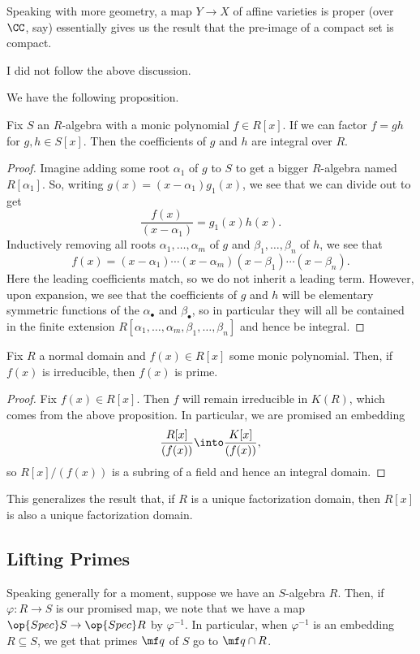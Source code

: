 Speaking with more geometry, a map $Y\to X$ of affine varieties is proper (over $\CC$, say) essentially gives us the result that the pre-image of a compact set is compact.
\begin{remark}
	I did not follow the above discussion.
\end{remark}
We have the following proposition.
\begin{proposition}
	Fix $S$ an $R$-algebra with a monic polynomial $f\in R[x]$. If we can factor $f=gh$ for $g,h\in S[x]$. Then the coefficients of $g$ and $h$ are integral over $R$.
\end{proposition}
\begin{proof}
	Imagine adding some root $\alpha_1$ of $g$ to $S$ to get a bigger $R$-algebra named $R[\alpha_1]$. So, writing $g(x)=(x-\alpha_1)g_1(x)$, we see that we can divide out to get
	\[\frac{f(x)}{(x-\alpha_1)}=g_1(x)h(x).\]
	Inductively removing all roots $\alpha_1,\ldots,\alpha_m$ of $g$ and $\beta_1,\ldots,\beta_n$ of $h$, we see that
	\[f(x)=(x-\alpha_1)\cdots(x-\alpha_m)(x-\beta_1)\cdots(x-\beta_n).\]
	Here the leading coefficients match, so we do not inherit a leading term. However, upon expansion, we see that the coefficients of $g$ and $h$ will be elementary symmetric functions of the $\alpha_\bullet$ and $\beta_\bullet$, so in particular they will all be contained in the finite extension $R[\alpha_1,\ldots,\alpha_m,\beta_1,\ldots,\beta_n]$ and hence be integral.
\end{proof}
\begin{corollary}
	Fix $R$ a normal domain and $f(x)\in R[x]$ some monic polynomial. Then, if $f(x)$ is irreducible, then $f(x)$ is prime.
\end{corollary}
\begin{proof}
	Fix $f(x)\in R[x]$. Then $f$ will remain irreducible in $K(R)$, which comes from the above proposition. In particular, we are promised an embedding
	\[\frac{R[x]}{(f(x))}\into\frac{K[x]}{(f(x))},\]
	so $R[x]/(f(x))$ is a subring of a field and hence an integral domain.
\end{proof}
\begin{remark}
	This generalizes the result that, if $R$ is a unique factorization domain, then $R[x]$ is also a unique factorization domain.
\end{remark}

\subsection{Lifting Primes}
Speaking generally for a moment, suppose we have an $S$-algebra $R$. Then, if $\varphi:R\to S$ is our promised map, we note that we have a map $\op{Spec}S\to\op{Spec}R$ by $\varphi^{-1}$. In particular, when $\varphi^{-1}$ is an embedding $R\subseteq S$, we get that primes $\mf q$ of $S$ go to $\mf q\cap R$.


